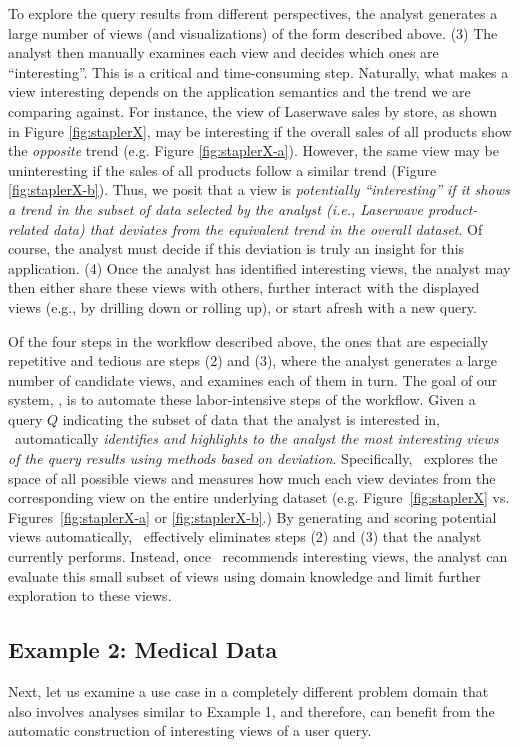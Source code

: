 To explore the query results from different perspectives, the analyst generates
a large number of views (and visualizations) of the form described above.
(3) The analyst then manually examines each view and decides
which ones are ``interesting''. This is a critical and time-consuming step.
Naturally, what makes a view interesting depends on the 
application semantics and the trend we are comparing against.
For instance, the view of Laserwave sales by store, as shown in Figure
\ref{fig:staplerX}, may be interesting if the overall sales of all products show
the {\it opposite} trend (e.g. Figure \ref{fig:staplerX-a}). However, the same
view may be uninteresting if the sales of all products follow a similar trend (Figure \ref{fig:staplerX-b}).
Thus, we posit that  a view is {\em potentially ``interesting'' if it shows 
a trend in the subset of data selected by the analyst
(i.e., Laserwave product-related data)
that deviates from the equivalent trend in the overall dataset}.
Of course, the analyst must decide if this deviation 
is truly an insight for this application.
(4) Once the analyst has identified interesting views, the analyst may
then either share these views with others, further interact with
the displayed views (e.g., by drilling down or rolling up), or
start afresh with a new query.


Of the four steps in the workflow described above, the 
ones that are especially repetitive and tedious are steps (2) and (3),
where the analyst generates a large number of candidate views, and examines each
of them in turn. The goal of our system, \SeeDB, is to automate these
labor-intensive steps of the workflow. Given a query $Q$ indicating the subset
of data that the analyst is interested in, \SeeDB\ automatically {\em identifies and highlights to the analyst the most
interesting views of the query results using methods based on
deviation}. Specifically, \SeeDB\ explores the space of all possible views and
measures how much each view deviates from the corresponding view on the
entire underlying dataset (e.g. Figure~\ref{fig:staplerX} vs.
Figures~\ref{fig:staplerX-a} or \ref{fig:staplerX-b}.) By generating and
scoring potential views automatically, \SeeDB\ effectively eliminates
steps (2) and (3) that the analyst currently performs. Instead, once \SeeDB\
recommends interesting views, the analyst can evaluate this small
subset of views using domain knowledge and limit further
exploration to these views.  

\subsection{Example 2: Medical Data}
Next, let us examine a use case in a completely different problem domain that
also involves analyses similar to Example 1, and therefore, can benefit from the
automatic construction of interesting views of a user query.

